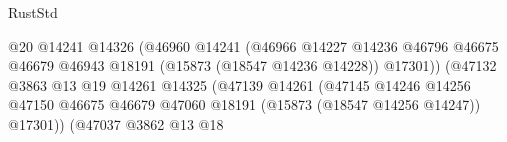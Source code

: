 \begin{lexlean}{RustStd}
\begin{coremodule}
                                                            @20
                                                            @14241
                                                            @14326
                                                            (@46960
                                                              @14241
                                                              (@46966
                                                                @14227
                                                                @14236
                                                                @46796
                                                                @46675
                                                                @46679
                                                                @46943
                                                                @18191
                                                                (@15873 (@18547 @14236 @14228))
                                                                @17301))
                                                            (@47132
                                                              @3863
                                                              @13
                                                              @19
                                                              @14261
                                                              @14325
                                                              (@47139
                                                                @14261
                                                                (@47145
                                                                  @14246
                                                                  @14256
                                                                  @47150
                                                                  @46675
                                                                  @46679
                                                                  @47060
                                                                  @18191
                                                                  (@15873 (@18547 @14256 @14247))
                                                                  @17301))
                                                              (@47037
                                                                @3862
                                                                @13
                                                                @18

\end{coremodule}
\end{lexlean}
